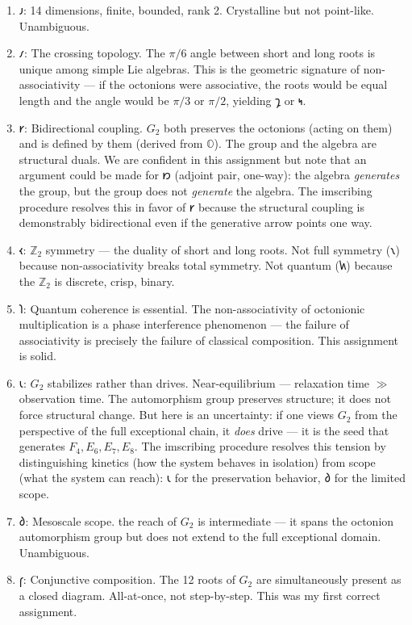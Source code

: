 \documentclass[12pt,a4paper]{article}
\begin{document}
\begin{enumerate}
    \item \textbf{$𐑨$}: 14 dimensions, finite, bounded, rank 2. Crystalline but not point-like. Unambiguous.
    \item \textbf{$𐑥$}: The crossing topology. The $\pi/6$ angle between short and long roots is unique among simple Lie algebras. This is the geometric signature of non-associativity --- if the octonions were associative, the roots would be equal length and the angle would be $\pi/3$ or $\pi/2$, yielding $𐑡$ or $𐑰$.
    \item \textbf{$𐑾$}: Bidirectional coupling. $G_2$ both preserves the octonions (acting on them) and is defined by them (derived from $\mathbb{O}$). The group and the algebra are structural duals. We are confident in this assignment but note that an argument could be made for $𐑽$ (adjoint pair, one-way): the algebra \emph{generates} the group, but the group does not \emph{generate} the algebra. The imscribing procedure resolves this in favor of $𐑾$ because the structural coupling is demonstrably bidirectional even if the generative arrow points one way.
    \item \textbf{$𐑬$}: $\mathbb{Z}_2$ symmetry --- the duality of short and long roots. Not full symmetry ($𐑯$) because non-associativity breaks total symmetry. Not quantum ($𐑿$) because the $\mathbb{Z}_2$ is discrete, crisp, binary.
    \item \textbf{$𐑐$}: Quantum coherence is essential. The non-associativity of octonionic multiplication is a phase interference phenomenon --- the failure of associativity is precisely the failure of classical composition. This assignment is solid.
    \item \textbf{$𐑧$}: $G_2$ stabilizes rather than drives. Near-equilibrium --- relaxation time $\gg$ observation time. The automorphism group preserves structure; it does not force structural change. But here is an uncertainty: if one views $G_2$ from the perspective of the full exceptional chain, it \emph{does} drive --- it is the seed that generates $F_4, E_6, E_7, E_8$. The imscribing procedure resolves this tension by distinguishing kinetics (how the system behaves in isolation) from scope (what the system can reach): $𐑧$ for the preservation behavior, $𐑔$ for the limited scope.
    \item \textbf{$𐑔$}: Mesoscale scope. the reach of $G_2$ is intermediate --- it spans the octonion automorphism group but does not extend to the full exceptional domain. Unambiguous.
    \item \textbf{$𐑝$}: Conjunctive composition. The 12 roots of $G_2$ are simultaneously present as a closed diagram. All-at-once, not step-by-step. This was my first correct assignment.

\end{enumerate}
\end{document}
